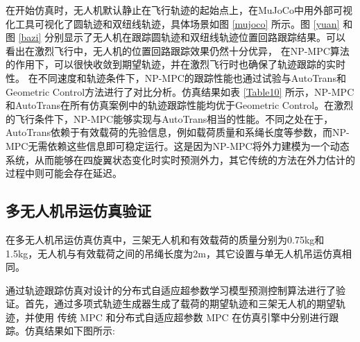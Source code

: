 \documentclass[lang=chs, degree=master, blindreview=true, winfonts=true]{yanputhesis}
\begin{document}
在开始仿真时，无人机默认静止在飞行轨迹的起始点上，在MuJoCo中用外部可视化工具可视化了圆轨迹和双纽线轨迹，具体场景如图 \ref{mujoco} 所示。图 \ref{yuan} 和图 \ref{bazi} 分别显示了无人机在跟踪圆轨迹和双纽线轨迹位置回路跟踪结果。可以看出在激烈飞行中，无人机的位置回路跟踪效果仍然十分优异， 在NP-MPC算法的作用下，可以很快收敛到期望轨迹，并在激烈飞行时也确保了轨迹跟踪的实时性。
在不同速度和轨迹条件下，NP-MPC的跟踪性能也通过试验与AutoTrans和Geometric Control方法进行了对比分析。仿真结果如表 \ref{Table10} 所示，NP-MPC和AutoTrans在所有仿真案例中的轨迹跟踪性能均优于Geometric Control。在激烈的飞行条件下，NP-MPC能够实现与AutoTrans相当的性能。不同之处在于，AutoTrans依赖于有效载荷的先验信息，例如载荷质量和系绳长度等参数，而NP-MPC无需依赖这些信息即可稳定运行。这是因为NP-MPC将外力建模为一个动态系统，从而能够在四旋翼状态变化时实时预测外力，其它传统的方法在外力估计的过程中则可能会存在延迟。

\subsection{多无人机吊运仿真验证}
在多无人机吊运仿真仿真中，三架无人机和有效载荷的质量分别为0.75kg和1.5kg，无人机与有效载荷之间的吊绳长度为2m，其它设置与单无人机吊运仿真相同。


通过轨迹跟踪仿真对设计的分布式自适应超参数学习模型预测控制算法进行了验证。首先，通过多项式轨迹生成器生成了载荷的期望轨迹和三架无人机的期望轨迹，并使用 传统 MPC 和分布式自适应超参数 MPC 在仿真引擎中分别进行跟踪。仿真结果如下图所示:
\end{document}
